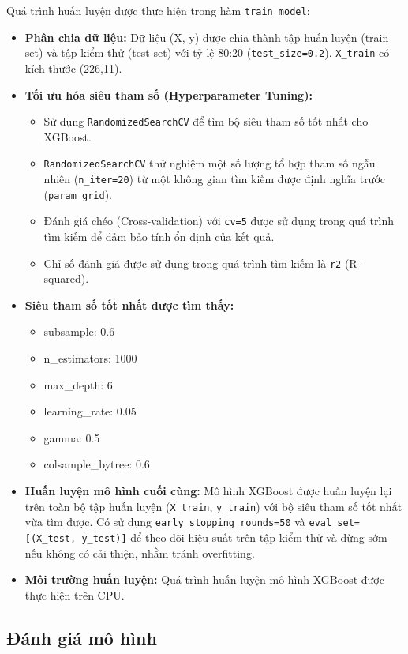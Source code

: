 \documentclass[12pt, a4paper]{report}
\begin{document}
Quá trình huấn luyện được thực hiện trong hàm \texttt{train\_model}:
\begin{itemize}
    \item \textbf{Phân chia dữ liệu:} Dữ liệu (X, y) được chia thành tập huấn luyện (train set) và tập kiểm thử (test set) với tỷ lệ 80:20 (\texttt{test\_size=0.2}). \texttt{X\_train} có kích thước (226,11).
    \item \textbf{Tối ưu hóa siêu tham số (Hyperparameter Tuning):}
    \begin{itemize}
        \item Sử dụng \texttt{RandomizedSearchCV} để tìm bộ siêu tham số tốt nhất cho XGBoost.
        \item \texttt{RandomizedSearchCV} thử nghiệm một số lượng tổ hợp tham số ngẫu nhiên (\texttt{n\_iter=20}) từ một không gian tìm kiếm được định nghĩa trước (\texttt{param\_grid}).
        \item Đánh giá chéo (Cross-validation) với \texttt{cv=5} được sử dụng trong quá trình tìm kiếm để đảm bảo tính ổn định của kết quả.
        \item Chỉ số đánh giá được sử dụng trong quá trình tìm kiếm là \texttt{r2} (R-squared).
    \end{itemize}
    \item \textbf{Siêu tham số tốt nhất được tìm thấy:}
    \begin{itemize}
        \item subsample: 0.6
        \item n\_estimators: 1000
        \item max\_depth: 6
        \item learning\_rate: 0.05
        \item gamma: 0.5
        \item colsample\_bytree: 0.6
    \end{itemize}
    \item \textbf{Huấn luyện mô hình cuối cùng:} Mô hình XGBoost được huấn luyện lại trên toàn bộ tập huấn luyện (\texttt{X\_train}, \texttt{y\_train}) với bộ siêu tham số tốt nhất vừa tìm được. Có sử dụng \texttt{early\_stopping\_rounds=50} và \texttt{eval\_set=[(X\_test, y\_test)]} để theo dõi hiệu suất trên tập kiểm thử và dừng sớm nếu không có cải thiện, nhằm tránh overfitting.
    \item \textbf{Môi trường huấn luyện:} Quá trình huấn luyện mô hình XGBoost được thực hiện trên CPU.
\end{itemize}

\subsection{Đánh giá mô hình}
\end{document}
